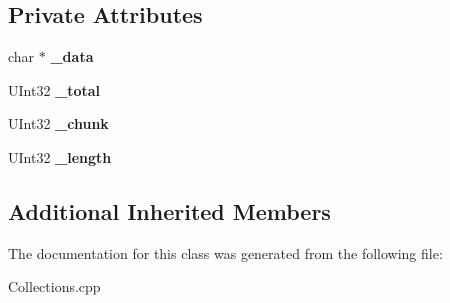 \subsection*{Private Attributes}
\begin{DoxyCompactItemize}
\item 
\mbox{\label{class_kernel_string_generator_a2466759e3a3bc1890e3fbd7e5a34df41}} 
char $\ast$ {\bfseries \+\_\+data}
\item 
\mbox{\label{class_kernel_string_generator_ab75c49c8d22d7e58314a7c28c06be550}} 
U\+Int32 {\bfseries \+\_\+total}
\item 
\mbox{\label{class_kernel_string_generator_a871448071ebc30f510dfb4a086de1610}} 
U\+Int32 {\bfseries \+\_\+chunk}
\item 
\mbox{\label{class_kernel_string_generator_aa42b64577134cce0204708dae680d56d}} 
U\+Int32 {\bfseries \+\_\+length}
\end{DoxyCompactItemize}
\subsection*{Additional Inherited Members}


The documentation for this class was generated from the following file\+:\begin{DoxyCompactItemize}
\item 
Collections.\+cpp\end{DoxyCompactItemize}

